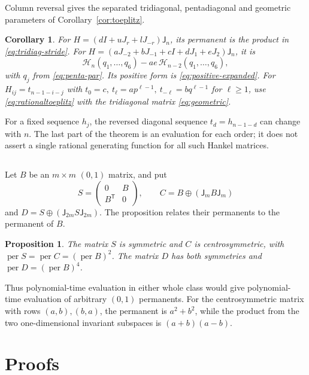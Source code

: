 \documentclass[11pt,reqno]{amsart}
\newtheorem{proposition}[theorem]{Proposition}
\newtheorem{corollary}[theorem]{Corollary}
\theoremstyle{remark}
\numberwithin{equation}{section}
\newcommand{\per}{\operatorname{per}}
\newcommand{\cH}{\mathcal H}
\begin{document}
Column reversal gives the separated tridiagonal, pentadiagonal
and geometric parameters of Corollary~\ref{cor:toeplitz}.

\begin{corollary}\label{cor:hankel}
For \(H=(dI+uJ_r+lJ_{-r})\mathsf J_n\), its permanent is the
product in \eqref{eq:tridiag-stride}. For
\(H=(aJ_{-2}+bJ_{-1}+cI+dJ_1+eJ_2)\mathsf J_n\), it is
\[
 \cH_n(q_1,\ldots,q_6)-ae\,\cH_{n-2}(q_1,\ldots,q_6),
\]
with \(q_j\) from \eqref{eq:penta-par}. Its positive form is
\eqref{eq:positive-expanded}. For \(H_{ij}=t_{n-1-i-j}\) with
\(t_0=c,\ t_\ell=ap^{\ell-1},\ t_{-\ell}=bq^{\ell-1}\)
for \(\ell\ge1\), use \eqref{eq:rationaltoeplitz} with the
tridiagonal matrix \eqref{eq:geometric}.
\end{corollary}

For a fixed sequence \(h_j\), the reversed diagonal sequence
\(t_d=h_{n-1-d}\) can change with \(n\). The last part of the
theorem is an evaluation for each order; it does not assert a
single rational generating function for all such Hankel matrices.

\subsection{}

Let \(B\) be an \(m\times m\) \((0,1)\) matrix, and put
\[
 S=\begin{pmatrix}0&B\\ B^{\mathsf T}&0\end{pmatrix},
 \qquad C=B\oplus(\mathsf J_mB\mathsf J_m)
\]
and \(D=S\oplus(\mathsf J_{2m}S\mathsf J_{2m})\).
The proposition relates their permanents to the permanent of \(B\).

\begin{proposition}\label{prop:symmetry}
The matrix \(S\) is symmetric and \(C\) is centrosymmetric,
with \(\per S=\per C=(\per B)^2\). The matrix \(D\) has
both symmetries and \(\per D=(\per B)^4\).
\end{proposition}

Thus polynomial-time evaluation in either whole class would give
polynomial-time evaluation of arbitrary \((0,1)\) permanents.
For the centrosymmetric matrix with rows \((a,b),(b,a)\), the
permanent is \(a^2+b^2\), while the product from the two
one-dimensional invariant subspaces is \((a+b)(a-b)\).

\section{Proofs}
\end{document}
